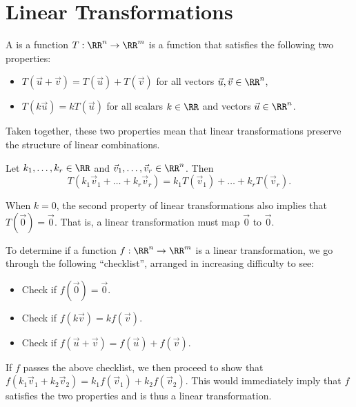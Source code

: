 \chapter{Linear Transformations}

\begin{definition}
    A  is a function $T : \RR^n \to \RR^m$ is a function that satisfies the following two properties:
    \begin{itemize}
        \item $T(\vec u + \vec v) = T(\vec u) + T(\vec v)$ for all vectors $\vec u, \vec v \in \RR^n$,
        \item $T(k \vec u) = k T(\vec u)$ for all scalars $k \in \RR$ and vectors $\vec u \in \RR^n$.
    \end{itemize}
\end{definition}

Taken together, these two properties mean that linear transformations preserve the structure of linear combinations.

\begin{proposition}
    Let $k_1, \dots, k_r \in \RR$ and $\vec v_1, \dots, \vec v_r \in \RR^n$. Then \[T(k_1 \vec v_1 + \dots + k_r \vec v_r) = k_1 T(\vec v_1) + \dots + k_r T(\vec v_r).\]
\end{proposition}

When $k = 0$, the second property of linear transformations also implies that $T(\vec 0) = \vec 0$. That is, a linear transformation must map $\vec 0$ to $\vec 0$.

\begin{recipe}
    To determine if a function $f : \RR^n \to \RR^m$ is a linear transformation, we go through the following ``checklist'', arranged in increasing difficulty to see:
    \begin{itemize}
        \item Check if $f(\vec 0) = \vec 0$.
        \item Check if $f(k \vec v) = k f(\vec v)$.
        \item Check if $f(\vec u + \vec v) = f(\vec u) + f(\vec v)$.
    \end{itemize}
    If $f$ passes the above checklist, we then proceed to show that $f(k_1 \vec v_1 + k_2 \vec v_2) = k_1 f(\vec v_1) + k_2 f(\vec v_2)$. This would immediately imply that $f$ satisfies the two properties and is thus a linear transformation.
\end{recipe}

